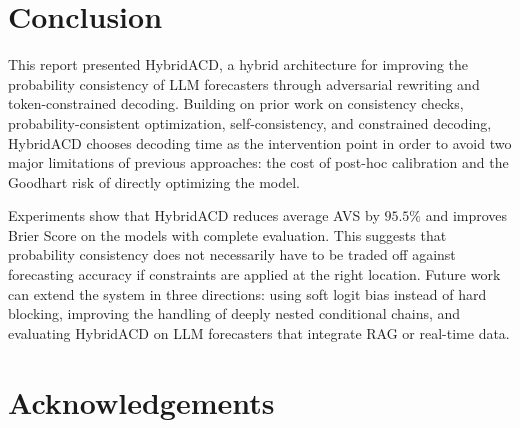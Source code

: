 \documentclass[pdflatex,sn-mathphys-num]{sn-jnl}
\begin{document}
\section{Conclusion}\label{sec:conclusion}

This report presented HybridACD, a hybrid architecture for improving the probability consistency of LLM forecasters through adversarial rewriting and token-constrained decoding. Building on prior work on consistency checks, probability-consistent optimization, self-consistency, and constrained decoding, HybridACD chooses decoding time as the intervention point in order to avoid two major limitations of previous approaches: the cost of post-hoc calibration and the Goodhart risk of directly optimizing the model.

Experiments show that HybridACD reduces average AVS by $95.5\%$ and improves Brier Score on the models with complete evaluation. This suggests that probability consistency does not necessarily have to be traded off against forecasting accuracy if constraints are applied at the right location. Future work can extend the system in three directions: using soft logit bias instead of hard blocking, improving the handling of deeply nested conditional chains, and evaluating HybridACD on LLM forecasters that integrate RAG or real-time data.

\section*{Acknowledgements}
\printbibliography
\end{document}

